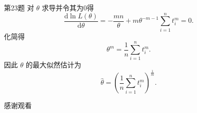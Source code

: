 \documentclass[aspectratio=169]{beamer}
\begin{document}
\begin{frame}{第23题}
对 $\theta$ 求导并令其为0得
\[
\frac{\mathrm{d}\ln L(\theta)}{\mathrm{d}\theta}
=-\frac{mn}{\theta}
+m\theta^{-m-1}\sum_{i=1}^n t_i^m=0.
\]
化简得
\[
\theta^m=\frac1n\sum_{i=1}^n t_i^m.
\]
因此 $\theta$ 的最大似然估计为
\[
\hat\theta=\left(\frac1n\sum_{i=1}^n t_i^m\right)^{\frac1m}.
\]
\end{frame}

\begin{frame}
\centering
\vfill
\Huge \textcolor{mycolor}{感谢观看} \\
\vfill
\end{frame}
\end{document}
